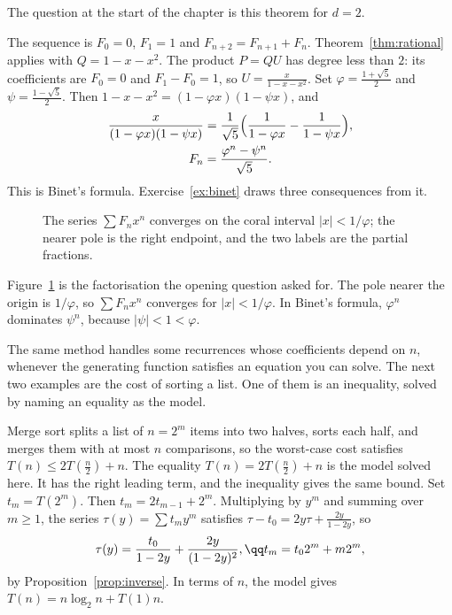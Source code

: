 The question at the start of the chapter is this theorem for $d=2$.

\begin{example}[Fibonacci]\label{ex:fibonacci}
The sequence is $F_0=0$, $F_1=1$ and $F_{n+2}=F_{n+1}+F_n$. Theorem~\ref{thm:rational} applies with $Q=1-x-x^2$. The product $P=QU$ has degree less than $2$: its coefficients are $F_0=0$ and $F_1-F_0=1$, so
$U=\frac x{1-x-x^2}$. Set $\varphi=\frac{1+\sqrt5}2$ and $\psi=\frac{1-\sqrt5}2$. Then $1-x-x^2=(1-\varphi x)(1-\psi x)$, and
\[
\begin{gathered}\frac x{(1-\varphi x)(1-\psi x)}=\frac1{\sqrt5}\Bigl(\frac1{1-\varphi x}-\frac1{1-\psi x}\Bigr),\\F_n=\frac{\varphi^n-\psi^n}{\sqrt5}.\end{gathered}
\]
This is Binet's formula. Exercise~\ref{ex:binet} draws three consequences from it.
\end{example}

\begin{figure}[ht]
\centering
{}
\caption{The series $\sum F_nx^n$ converges on the coral interval $|x|<1/\varphi$; the nearer pole is the right endpoint, and the two labels are the partial fractions.}
\label{fig:rw02-fibsplit}
\end{figure}

Figure~\ref{fig:rw02-fibsplit} is the factorisation the opening question asked for. The pole nearer the origin is $1/\varphi$, so $\sum F_nx^n$ converges for $|x|<1/\varphi$. In Binet's formula, $\varphi^n$ dominates $\psi^n$, because $|\psi|<1<\varphi$.

The same method handles some recurrences whose coefficients depend on $n$, whenever the generating function satisfies an equation you can solve. The next two examples are the cost of sorting a list. One of them is an inequality, solved by naming an equality as the model.

\begin{example}\label{ex:mergesort}
Merge sort splits a list of $n=2^m$ items into two halves, sorts each half, and merges them with at most $n$ comparisons, so the
worst-case cost satisfies $T(n)\le 2T(\frac n2)+n$. The equality $T(n)=2T(\frac n2)+n$ is the model solved here. It has the right leading term, and the inequality gives the same bound. Set $t_m=T(2^m)$. Then $t_m=2t_{m-1}+2^m$. Multiplying by
$y^m$ and summing over $m\ge1$, the series $\tau(y)=\sum t_my^m$ satisfies $\tau-t_0=2y\tau+\frac{2y}{1-2y}$, so
\[
\tau(y)=\frac{t_0}{1-2y}+\frac{2y}{(1-2y)^2},\qq t_m=t_02^m+m2^m,
\]
by Proposition~\ref{prop:inverse}. In terms of $n$, the model gives $T(n)=n\log_2n+T(1)n$.
\end{example}

